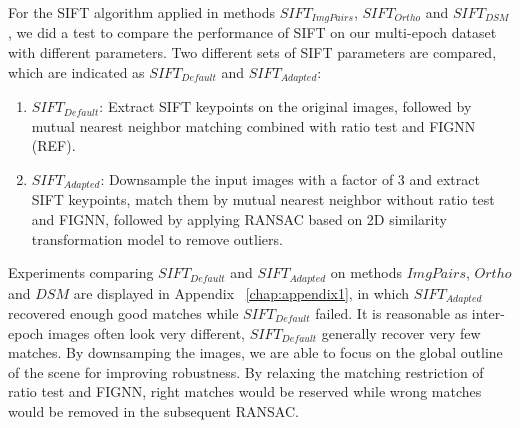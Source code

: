 For the SIFT algorithm applied in methods $SIFT_{ImgPairs}$, $SIFT_{Ortho}$ and $SIFT_{DSM}$, we did a test to compare the performance of SIFT on our multi-epoch dataset with different parameters. Two different sets of SIFT parameters are compared, which are indicated as $SIFT_{Default}$ and $SIFT_{Adapted}$:\\
\begin{enumerate}
	\item \textbf{$SIFT_{Default}$}: Extract SIFT keypoints on the original images, followed by mutual nearest neighbor matching combined with ratio test and FIGNN (REF).
	\item \textbf{$SIFT_{Adapted}$}: Downsample the input images with a factor of 3 and extract SIFT keypoints, match them by mutual nearest neighbor without ratio test and FIGNN, followed by applying RANSAC based on 2D similarity transformation model to remove outliers.
\end{enumerate}

Experiments comparing $SIFT_{Default}$ and $SIFT_{Adapted}$ on methods ${ImgPairs}$, ${Ortho}$ and ${DSM}$ are displayed in Appendix ~\ref{chap:appendix1}, in which $SIFT_{Adapted}$ recovered enough good matches while $SIFT_{Default}$ failed. It is reasonable as inter-epoch images often look very different, $SIFT_{Default}$ generally recover very few matches. By downsamping the images, we are able to focus on the global outline of the scene for improving robustness. By relaxing the matching restriction of ratio test and FIGNN, right matches would be reserved while wrong matches would be removed in the subsequent RANSAC.\\

